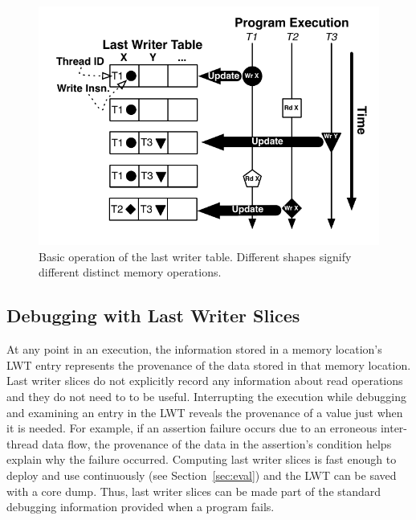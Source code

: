 \documentclass[preprint,9pt]{sigplanconf}
\newcommand{\lwt}{LWT\xspace}
\begin{document}
\begin{figure}[h]
\centering
\includegraphics[scale=.6]{figs/BasicLWT.pdf}
\caption{\label{fig:basicLWT}Basic operation of the last writer table. Different shapes signify different distinct memory operations. }
\end{figure}


\subsection{Debugging with Last Writer Slices}
\label{sec:debugging}

At any point in an execution, the information stored in a memory location's
\lwt entry represents the provenance of the data stored in that memory
location.   Last writer slices do not explicitly record any information about
read operations and they do not need to to be useful.  Interrupting the
execution while debugging and examining an entry in the \lwt reveals the
provenance of a value just when it is needed.  For example, if an assertion
failure occurs due to an erroneous inter-thread data flow, the provenance of
the data in the assertion's condition helps explain why the failure occurred.
Computing last writer slices is fast enough to deploy and use continuously
(see Section~\ref{sec:eval}) and the \lwt can be saved with a core dump.
Thus, last writer slices can be made part of the standard debugging
information provided when a program fails.  
\end{document}
